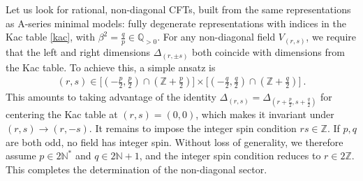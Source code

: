 \documentclass[12pt, a4paper]{article}
\theoremstyle{break}
\begin{document}
Let us look for rational, non-diagonal CFTs, built from the same representations as A-series minimal models: fully degenerate representations with indices in the Kac table \eqref{kac}, with $\beta^2=\frac{q}{p}\in\mathbb{Q}_{>0}$. For any non-diagonal field $V_{(r,s)}$, we require that the left and right dimensions $\Delta_{(r,\pm s)}$ both coincide with dimensions from the Kac table. To achieve this, a simple ansatz is 
\begin{align}
 (r,s) \in \Big[\left(-\tfrac{p}{2},\tfrac{p}{2}\right) \cap \left(\mathbb{Z}+\tfrac{p}{2}\right)\Big] \times \Big[\left(-\tfrac{q}{2},\tfrac{q}{2}\right) \cap \left(\mathbb{Z}+\tfrac{q}{2}\right)\Big] \ . 
\end{align}
This amounts to taking advantage of the identity $\Delta_{(r,s)}=\Delta_{(r+\frac{p}{2},s+\frac{q}{2})}$ for centering the Kac table at $(r,s)=(0,0)$, which makes it invariant under $(r,s)\to (r,-s)$. It remains to impose the integer spin condition $rs\in\mathbb{Z}$. If $p,q$ are both odd, no field has integer spin. Without loss of generality, we therefore assume $p\in 2\mathbb{N}^*$ and $q\in 2\mathbb{N}+1$, 
and the integer spin condition reduces to $r\in 2\mathbb{Z}$. This completes the determination of the non-diagonal sector. 
\end{document}
